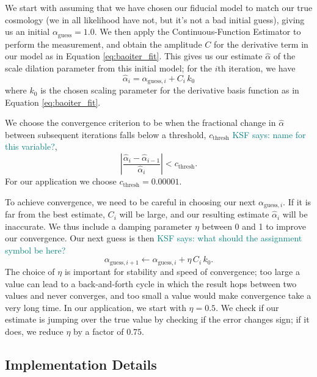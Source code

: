 \documentclass[modern]{aastex62}
\newcommand{\est}{the Continuous-Function Estimator\xspace}
\newcommand{\KSF}[1]{\textcolor{teal}{KSF says: #1}}
\begin{document}
We start with assuming that we have chosen our fiducial model to match our true cosmology (we in all likelihood have not, but it's not a bad initial guess), giving us an initial $\alpha_\mathrm{guess} = 1.0$. 
We then apply \est to perform the measurement, and obtain the amplitude $C$ for the derivative term in our model as in Equation \ref{eq:baoiter_fit}. 
This gives us our estimate $\hat{\alpha}$ of the scale dilation parameter from this initial model; for the $i$th iteration, we have
\begin{equation}
    \hat{\alpha}_{i} = \alpha_{\mathrm{guess},i} + C_i \, k_0
\end{equation}
where $k_0$ is the chosen scaling parameter for the derivative basis function as in Equation \ref{eq:baoiter_fit}.

We choose the convergence criterion to be when the fractional change in $\hat{\alpha}$ between subsequent iterations falls below a threshold, $c_\mathrm{thresh}$ \KSF{name for this variable?},
\begin{equation}
    \left| \frac{\hat{\alpha}_i - \hat{\alpha}_{i-1}}{\hat{\alpha}_i} \right| < c_\mathrm{thresh}.
\end{equation}
For our application we choose $c_\mathrm{thresh} = 0.00001$.

To achieve convergence, we need to be careful in choosing our next $\alpha_{\mathrm{guess},i}$.
If it is far from the best estimate, $C_i$ will be large, and our resulting estimate $\hat{\alpha}_{i}$ will be inaccurate.
We thus include a damping parameter $\eta$ between 0 and 1 to improve our convergence.
Our next guess is then
\KSF{what should the assignment symbol be here?}
\begin{equation}
    \alpha_{\mathrm{guess},i+1} \leftarrow \alpha_{\mathrm{guess},i} + \eta\,C_i\,k_0.
\end{equation}
The choice of $\eta$ is important for stability and speed of convergence; too large a value can lead to a back-and-forth cycle in which the result hops between two values and never converges, and too small a value would make convergence take a very long time.
In our application, we start with $\eta=0.5$.
We check if our estimate is jumping over the true value by checking if the error changes sign; if it does, we reduce $\eta$ by a factor of $0.75$.

\subsection{Implementation Details}
\end{document}

